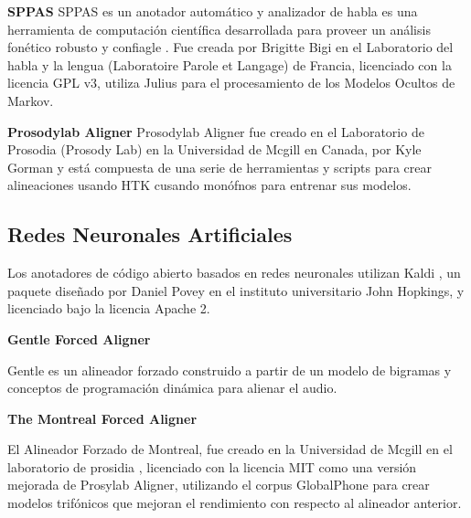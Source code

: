 \textbf{SPPAS}
SPPAS es un anotador automático y analizador de habla es una herramienta de computación científica desarrollada para proveer un análisis fonético robusto y confiagle \cite{Bigi2016ASPPAS}. Fue creada por Brigitte Bigi  en el Laboratorio del habla y la lengua (Laboratoire Parole et Langage) de Francia, licenciado con la licencia GPL v3, utiliza Julius para el procesamiento de los Modelos Ocultos de Markov.

\textbf{Prosodylab Aligner}
Prosodylab Aligner \cite{Gorman2011Prosodylab-aligner:Speech} fue creado en el Laboratorio de Prosodia (Prosody Lab) en la Universidad de Mcgill en Canada, por Kyle Gorman y está compuesta de una serie de herramientas y scripts para crear alineaciones usando HTK cusando monófnos para entrenar sus modelos.

\subsection{Redes Neuronales Artificiales}

Los anotadores de código abierto basados en redes neuronales utilizan Kaldi \cite{Povey_ASRU2011}, un paquete diseñado por Daniel Povey en el instituto universitario John Hopkings, y licenciado bajo la licencia Apache 2.

\textbf{Gentle Forced Aligner}

Gentle \cite{gentle} es un alineador forzado construido a partir de un modelo de bigramas y conceptos de programación dinámica para alienar el audio.

\textbf{The Montreal Forced Aligner}

El Alineador Forzado de Montreal, fue creado en la Universidad de Mcgill en el laboratorio de prosidia \cite{McAuliffe2017MontrealKaldi}, licenciado con la licencia MIT  como una versión mejorada de Prosylab Aligner, utilizando el corpus GlobalPhone  para crear modelos trifónicos que mejoran el rendimiento con respecto al alineador anterior.
